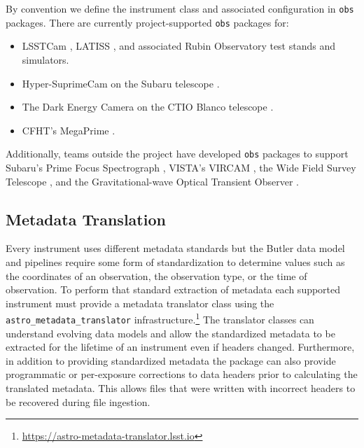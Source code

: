 By convention we define the instrument class and associated configuration in \texttt{obs} packages.
There are currently project-supported \texttt{obs} packages for:

\begin{itemize}
\item LSSTCam \citep{2024SPIE13096E..1SR,2024SPIE13096E..1OL, 2024SPIE13103E..0WU,2010SPIE.7735E..0JK}, LATISS \citep{2020SPIE11452E..0UI}, and associated Rubin Observatory test stands and simulators.
\item Hyper-SuprimeCam on the Subaru telescope \citep{2018PASJ...70S...1M}.
\item The Dark Energy Camera on the CTIO Blanco telescope \citep{2015AJ....150..150F,2008SPIE.7014E..0ED}.
\item CFHT's MegaPrime \citep{2003SPIE.4841...72B}.
\end{itemize}

Additionally, teams outside the project have developed \texttt{obs} packages to support Subaru's Prime Focus Spectrograph \citep{2020SPIE11447E..7VW}, VISTA's VIRCAM \citep{2015A&A...575A..25S},
the Wide Field Survey Telescope \citep[WFST;][]{2025arXiv250115018C}, and the Gravitational-wave Optical Transient Observer \citep[GOTO;][]{2021PASA...38....4M}.

\subsection{Metadata Translation}

Every instrument uses different metadata standards but the Butler data model and pipelines require some form of standardization to determine values such as the coordinates of an observation, the observation type, or the time of observation.
To perform that standard extraction of metadata each supported instrument must provide a metadata translator class using the \texttt{astro\_metadata\_translator} infrastructure.\footnote{\url{https://astro-metadata-translator.lsst.io}}
The translator classes can understand evolving data models and allow the standardized metadata to be extracted for the lifetime of an instrument even if headers changed.
Furthermore, in addition to providing standardized metadata the package can also provide programmatic or per-exposure corrections to data headers prior to calculating the translated metadata.
This allows files that were written with incorrect headers to be recovered during file ingestion.


